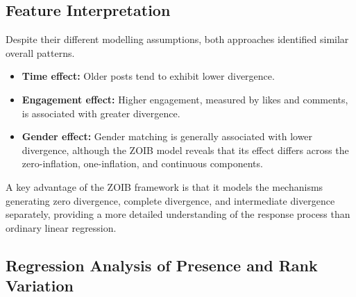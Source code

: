 \subsection{Feature Interpretation}

Despite their different modelling assumptions, both approaches identified similar overall patterns.

\begin{itemize}
    \item \textbf{Time effect:} Older posts tend to exhibit lower divergence.
    \item \textbf{Engagement effect:} Higher engagement, measured by likes and comments, is associated with greater divergence.
    \item \textbf{Gender effect:} Gender matching is generally associated with lower divergence, although the ZOIB model reveals that its effect differs across the zero-inflation, one-inflation, and continuous components.
\end{itemize}

A key advantage of the ZOIB framework is that it models the mechanisms generating zero divergence, complete divergence, and intermediate divergence separately, providing a more detailed understanding of the response process than ordinary linear regression.

\subsection{Regression Analysis of Presence and Rank Variation}


